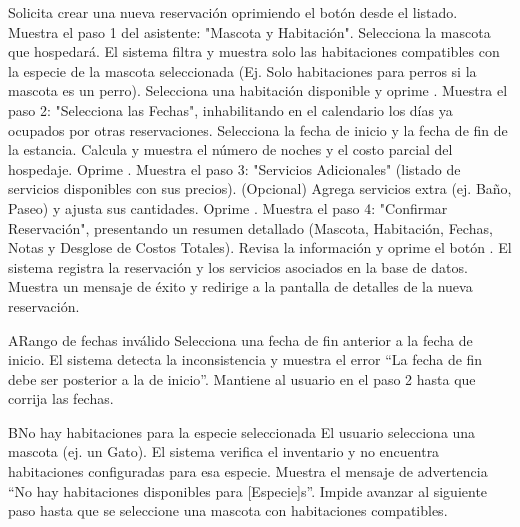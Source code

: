 \begin{UCtrayectoria}
    \UCpaso[\UCactor] Solicita crear una nueva reservación oprimiendo el botón  desde el listado.
    \UCpaso Muestra el paso 1 del asistente: "Mascota y Habitación".
    \UCpaso[\UCactor] Selecciona la mascota que hospedará.
    \UCpaso El sistema filtra y muestra solo las habitaciones compatibles con la especie de la mascota seleccionada (Ej. Solo habitaciones para perros si la mascota es un perro).
    \UCpaso[\UCactor] Selecciona una habitación disponible y oprime .
    \UCpaso Muestra el paso 2: "Selecciona las Fechas", inhabilitando en el calendario los días ya ocupados por otras reservaciones.
    \UCpaso[\UCactor] Selecciona la fecha de inicio y la fecha de fin de la estancia.
    \UCpaso Calcula y muestra el número de noches y el costo parcial del hospedaje. Oprime .
    \UCpaso Muestra el paso 3: "Servicios Adicionales" (listado de servicios disponibles con sus precios).
    \UCpaso[\UCactor] (Opcional) Agrega servicios extra (ej. Baño, Paseo) y ajusta sus cantidades. Oprime .
    \UCpaso Muestra el paso 4: "Confirmar Reservación", presentando un resumen detallado (Mascota, Habitación, Fechas, Notas y Desglose de Costos Totales).
    \UCpaso[\UCactor] Revisa la información y oprime el botón .
    \UCpaso El sistema registra la reservación y los servicios asociados en la base de datos.
    \UCpaso Muestra un mensaje de éxito y redirige a la pantalla de detalles de la nueva reservación.
\end{UCtrayectoria}


\begin{UCtrayectoriaA}{A}{Rango de fechas inválido}
    \UCpaso[\UCactor] Selecciona una fecha de fin anterior a la fecha de inicio.
    \UCpaso El sistema detecta la inconsistencia y muestra el error ``La fecha de fin debe ser posterior a la de inicio''.
    \UCpaso Mantiene al usuario en el paso 2 hasta que corrija las fechas.
\end{UCtrayectoriaA}

\begin{UCtrayectoriaA}{B}{No hay habitaciones para la especie seleccionada}
    \UCpaso El usuario selecciona una mascota (ej. un Gato).
    \UCpaso El sistema verifica el inventario y no encuentra habitaciones configuradas para esa especie.
    \UCpaso Muestra el mensaje de advertencia ``No hay habitaciones disponibles para [Especie]s''.
    \UCpaso Impide avanzar al siguiente paso hasta que se seleccione una mascota con habitaciones compatibles.
\end{UCtrayectoriaA}


